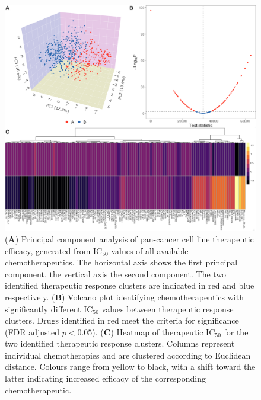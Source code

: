 \documentclass[10pt, letterpaper, twocolumn]{article}
\begin{document}
\begin{figure}[!ht]
    \centering
    \includegraphics[width=\textwidth]{Figures/clustering.png}

    \caption{(\textbf{A}) Principal component analysis of pan-cancer cell line therapeutic efficacy, generated from IC$_{50}$ values of all available chemotherapeutics. The horizontal axis shows the first principal component, the vertical axis the second component. The two identified therapeutic response clusters are indicated in red and blue respectively. (\textbf{B}) Volcano plot identifying chemotherapeutics with significantly different IC$_{50}$ values between therapeutic response clusters. Drugs identified in red meet the criteria for significance (FDR adjusted $p<0.05$). (\textbf{C}) Heatmap of therapeutic IC$_{50}$ for the two identified therapeutic response clusters. Columns represent individual chemotherapies and are clustered according to Euclidean distance. Colours range from yellow to black, with a shift toward the latter indicating increased efficacy of the corresponding chemotherapeutic.}
    \label{fig:clustering}
\end{figure}
\end{document}
